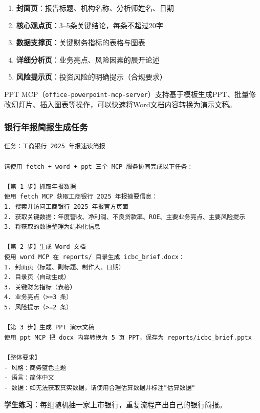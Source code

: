 \begin{enumerate}[leftmargin=2em]
  \item \textbf{封面页}：报告标题、机构名称、分析师姓名、日期
  \item \textbf{核心观点页}：3--5条关键结论，每条不超过20字
  \item \textbf{数据支撑页}：关键财务指标的表格与图表
  \item \textbf{详细分析页}：业务亮点、风险因素的展开论述
  \item \textbf{风险提示页}：投资风险的明确提示（合规要求）
\end{enumerate}

PPT MCP（\texttt{office-powerpoint-mcp-server}）支持基于模板生成PPT、批量修改幻灯片、插入图表等操作，可以快速将Word文档内容转换为演示文稿。

\subsubsection{银行年报简报生成任务}

\begin{lstlisting}
任务：工商银行 2025 年报速读简报

请使用 fetch + word + ppt 三个 MCP 服务协同完成以下任务：

【第 1 步】抓取年报数据
使用 fetch MCP 获取工商银行 2025 年报摘要信息：
1. 搜索并访问工商银行 2025 年报官方页面
2. 获取关键数据：年度营收、净利润、不良贷款率、ROE、主要业务亮点、主要风险提示
3. 将获取的数据整理为结构化信息

【第 2 步】生成 Word 文档
使用 word MCP 在 reports/ 目录生成 icbc_brief.docx：
1. 封面页（标题、副标题、制作人、日期）
2. 目录页（自动生成）
3. 关键财务指标（表格）
4. 业务亮点（>=3 条）
5. 风险提示（>=2 条）

【第 3 步】生成 PPT 演示文稿
使用 ppt MCP 把 docx 内容转换为 5 页 PPT，保存为 reports/icbc_brief.pptx

【整体要求】
- 风格：商务蓝色主题
- 语言：简体中文
- 数据：如无法获取真实数据，请使用合理估算数据并标注"估算数据"
\end{lstlisting}

\textbf{学生练习}：每组随机抽一家上市银行，重复流程产出自己的银行简报。

